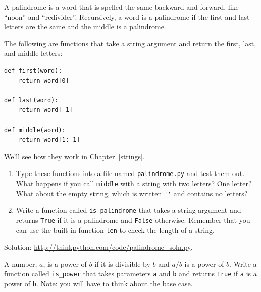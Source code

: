 \documentclass[10pt]{book}
\begin{document}
\begin{CJK}{UTF8}{gbsn}
\begin{exercise}
\end{exercise}


\begin{exercise}
\label{palindrome}

A palindrome is a word that is spelled the same backward and
forward, like ``noon'' and ``redivider''.  Recursively, a word
is a palindrome if the first and last letters are the same
and the middle is a palindrome.

The following are functions that take a string argument and
return the first, last, and middle letters:

\begin{verbatim}
def first(word):
    return word[0]

def last(word):
    return word[-1]

def middle(word):
    return word[1:-1]
\end{verbatim}
%
We'll see how they work in Chapter~\ref{strings}.

\begin{enumerate}

\item Type these functions into a file named {\tt palindrome.py}
and test them out.  What happens if you call {\tt middle} with
a string with two letters?  One letter?  What about the empty
string, which is written \verb"''" and contains no letters?

\item Write a function called \verb"is_palindrome" that takes
a string argument and returns {\tt True} if it is a palindrome
and {\tt False} otherwise.  Remember that you can use the
built-in function {\tt len} to check the length of a string.

\end{enumerate}

Solution: \url{http://thinkpython.com/code/palindrome_soln.py}.

\end{exercise}

\begin{exercise}

A number, $a$, is a power of $b$ if it is divisible by $b$
and $a/b$ is a power of $b$.  Write a function called
\verb"is_power" that takes parameters {\tt a} and {\tt b}
and returns {\tt True} if {\tt a} is a power of {\tt b}.
Note: you will have to think about the base case.

\end{exercise}



\end{CJK}
\end{document}
